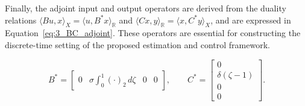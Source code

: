 Finally, the adjoint input and output operators are derived from the duality relations $\langle Bu, x \rangle_X = \langle u, B^* x \rangle_\mathbb{R}$ and $\langle Cx, y \rangle_\mathbb{R} = \langle x, C^* y \rangle_X$, and are expressed in Equation~\eqref{eq:3_BC_adjoint}. These operators are essential for constructing the discrete-time setting of the proposed estimation and control framework.

\begin{equation} \label{eq:3_BC_adjoint}
B^* = \begin{bmatrix} 0 & \sigma \int_0^1 (\cdot)_2\, d\zeta & 0 & 0 \end{bmatrix}, \qquad
C^* = \begin{bmatrix} 0 \\ \delta(\zeta - 1) \\ 0 \\ 0 \end{bmatrix}.
\end{equation}